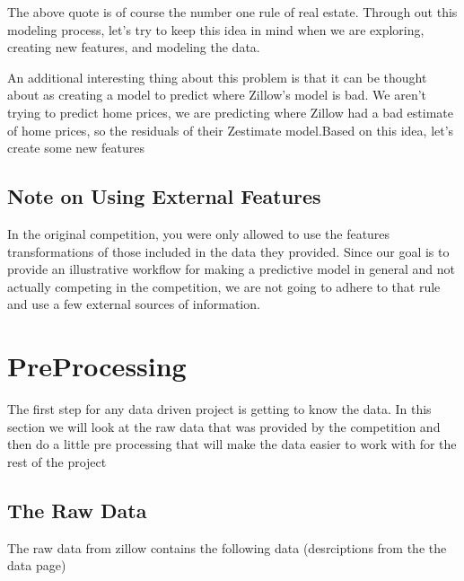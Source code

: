 \documentclass[]{book}
\theoremstyle{definition}
\theoremstyle{definition}
\theoremstyle{definition}
\theoremstyle{remark}
\begin{document}
The above quote is of course the number one rule of real estate. Through
out this modeling process, let's try to keep this idea in mind when we
are exploring, creating new features, and modeling the data.

An additional interesting thing about this problem is that it can be
thought about as creating a model to predict where Zillow's model is
bad. We aren't trying to predict home prices, we are predicting where
Zillow had a bad estimate of home prices, so the residuals of their
Zestimate model.Based on this idea, let's create some new features

\section{Note on Using External
Features}\label{note-on-using-external-features}

In the original competition, you were only allowed to use the features
transformations of those included in the data they provided. Since our
goal is to provide an illustrative workflow for making a predictive
model in general and not actually competing in the competition, we are
not going to adhere to that rule and use a few external sources of
information.

\chapter{PreProcessing}\label{preprocessing}

The first step for any data driven project is getting to know the data.
In this section we will look at the raw data that was provided by the
competition and then do a little pre processing that will make the data
easier to work with for the rest of the project

\section{The Raw Data}\label{the-raw-data}

The raw data from zillow contains the following data (desrciptions from
the the data page)
\end{document}
